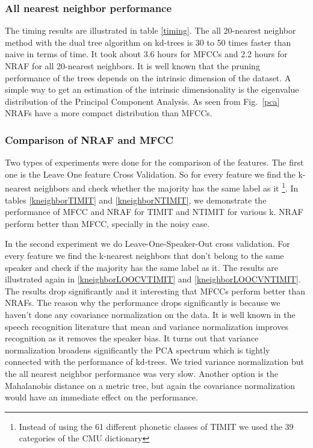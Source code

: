 \documentclass[12pt,letterpaper,doublespaced,ETD,dvips,proposal]{gtthesis}
\begin{document}
\begin{Body}
\subsubsection{All nearest neighbor performance}
The timing results are illustrated in table \ref{timing}. The all
20-nearest neighbor method with the dual tree algorithm on kd-trees
is 30 to 50 times faster than naive in terms of time. It took about
3.6 hours for MFCCs and 2.2 hours for NRAF for all 20-nearest
neighbors. It is well known that the pruning performance of the
trees depends on the intrinsic dimension of the dataset. A simple
way to get an estimation of the intrinsic dimensionality is the
eigenvalue distribution of the Principal Component Analysis. As seen
from Fig.~\ref{pca} NRAFs have a more compact distribution than
MFCCs.

\subsubsection{Comparison of NRAF and MFCC} 
\label{Feature_Comparison}
Two types of experiments were done for the comparison of the features. The first
one is the Leave One feature Cross Validation. So for every feature
we find the k-nearest neighbors and check whether the majority has
the same label as it \footnote{Instead of using the 61 different
phonetic classes of TIMIT we used the 39 categories of the CMU
dictionary}. In tables \ref{kneighborTIMIT} and
\ref{kneighborNTIMIT}, we demonstrate the performance of MFCC and
NRAF for TIMIT and NTIMIT for various k. NRAF perform better than
MFCC, specially in the noisy case.

In the second experiment we do Leave-One-Speaker-Out cross
validation. For every feature we find the k-nearest neighbors that
don't belong to the same speaker and check if the majority has the
same label as it. The results are illustrated again in
\ref{kneighborLOOCVTIMIT} and \ref{kneighborLOOCVNTIMIT}. The
results drop significantly and it interesting that MFCCs perform
better than NRAFs. The reason why the performance drops
significantly is because we haven't done any covariance
normalization on the data. It is well known in the speech
recognition literature that mean and variance normalization improves
recognition as it removes the speaker bias. It turns out that
variance normalization broadens significantly the PCA spectrum which
is tightly connected with the performance of kd-trees. We tried
variance normalization but the all nearest neighbor performance was
very slow. Another option is the Mahalanobis distance on a metric
tree, but again the covariance normalization would have an immediate
effect on the performance.


\end{Body}
\end{document}
